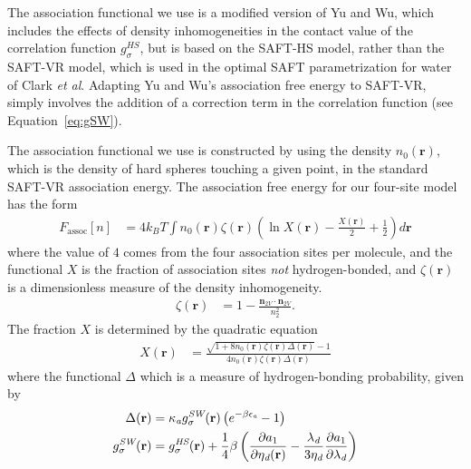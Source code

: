 \documentclass[letterpaper,twocolumn,amsmath,amssymb,prb]{revtex4-1}
\newcommand{\xx}{\textbf{r}}
\begin{document}
The association functional we use is a modified version of Yu
and Wu\cite{yu2002fmt-dft-inhomogeneous-associating}, which
includes the effects of density inhomogeneities in the contact value
of the correlation function $g^{HS}_\sigma$, but is based on the
SAFT-HS model, rather than the SAFT-VR
model\cite{gil-villegas-1997-SAFT-VR}, which is used in the optimal
SAFT parametrization for water of Clark \emph{et
  al}\cite{clark2006developing}.  Adapting Yu and Wu's association
free energy to SAFT-VR, simply involves the addition of a correction
term in the correlation function (see Equation~\ref{eq:gSW}).

The association functional we use is constructed by using the density
$n_0(\xx)$, which is the density of hard spheres touching a given
point, in the standard SAFT-VR association
energy\cite{gil-villegas-1997-SAFT-VR}.
The association free energy for our four-site model has the form
\begin{align}
  F_\text{assoc}[n] &= 4 k_BT \int n_0(\xx) \zeta(\xx)
  \left(\ln X(\xx) - \frac{X(\xx)}{2} + \frac12\right) d\xx
\end{align}
where the value of $4$ comes from the four association sites per
molecule, and the functional $X$ is the fraction of association sites
\emph{not} hydrogen-bonded, and $\zeta(\xx)$ is a dimensionless
measure of the density inhomogeneity.
\begin{align}
  \zeta(\xx) &= 1 - \frac{\mathbf{n}_{2V}\cdot\mathbf{n}_{2V}}{n_2^2}.
\end{align}
%
The fraction $X$ is determined by the quadratic equation
\begin{align}
  X(\xx) &= \frac{\sqrt{1 + 8n_0(\xx)\zeta(\xx)
      \Delta(\xx)} - 1}
  {4 n_0(\xx)\zeta(\xx)
    \Delta(\xx)}
\end{align}
where the functional $\Delta$ which is a measure of hydrogen-bonding
probability, given by
\begin{align}
  \Delta(\xx) &= \kappaassoc g^\textit{SW}_\sigma(\xx)
  \left(e^{-\beta\epsilonassoc} - 1\right) \\
  g^\textit{SW}_\sigma(\xx) &= g^\textit{HS}_\sigma(\xx) +
  \frac{1}{4}\beta\left(\frac{\partial a_1}{\partial \etadisp(\xx)} -
  \frac{\lambdadisp}{3 \etadisp}\frac{\partial a_1}{\partial \lambdadisp}\right)\label{eq:gSW}
\end{align}
\end{document}
